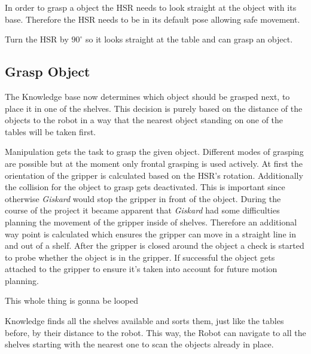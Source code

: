 \documentclass[main.tex]{subfiles}
\begin{document}
	In order to grasp a object the HSR needs to look straight at the object with its base. Therefore the HSR needs to be in its default pose allowing safe movement.
	
	
	
	Turn the HSR by $90^\circ$ so it looks straight at the table and can grasp an object.
	
	\subsection{Grasp Object}
	
	The Knowledge base now determines which object should be grasped next, to place it in one of the shelves. This decision is purely based on the distance of the objects to the robot in a way that the nearest object standing on one of the tables will be taken first.
	
	
	Manipulation gets the task to grasp the given object. Different modes of grasping are possible but at the moment only frontal grasping is used actively. At first the orientation of the gripper is calculated based on the HSR's rotation. Additionally the collision for the object to grasp gets deactivated. This is important since otherwise \textit{Giskard} would stop the gripper in front of the object. During the course of the project it became apparent that \textit{Giskard} had some difficulties planning the movement of the gripper inside of shelves. Therefore an additional way point is calculated which ensures the gripper can move in a straight line in and out of a shelf. After the gripper is closed around the object a check is started to probe whether the object is in the gripper. If successful the object gets attached to the gripper to ensure it's taken into account for future motion planning.   
	
	This whole thing is gonna be looped 
	
	
	Knowledge finds all the shelves available and sorts them, just like the tables before, by their distance to the robot. This way, the Robot can navigate to all the shelves starting with the nearest one to scan the objects already in place.
	
	
\end{document}
